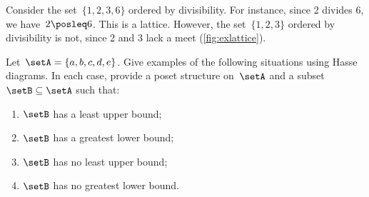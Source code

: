 \begin{example}
  Consider the set~$\{1,2,3,6\}$ ordered by divisibility. For instance, since 2 divides 6, we have~$2\posleq 6$.
  This is a lattice. However, the set~$\{1,2,3\}$ ordered by divisibility is not, since 2 and 3 lack a meet (\cref{fig:exlattice}).
\end{example}


\begin{gradedexercise} \label{ex:UpperLowerBounds}
Let~$\setA = \{a, b, c, d, e \}$. Give examples of the following situations using Hasse diagrams.
In each case, provide a poset structure on~$\setA$ and a subset~$\setB \subseteq \setA$ such that:
\begin{enumerate}
\item $\setB$ has a least upper bound;
\item $\setB$ has a greatest lower bound; 
\item $\setB$ has no least upper bound;
\item $\setB$ has no greatest lower bound. 
\end{enumerate}
\end{gradedexercise}



